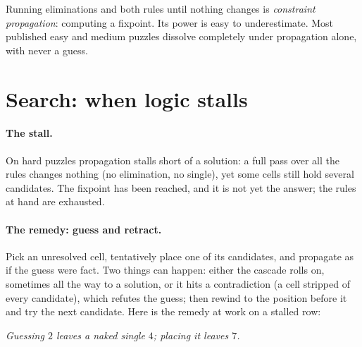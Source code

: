 \documentclass[11pt]{article}
\begin{document}
Running eliminations and both rules until nothing changes is
\emph{constraint propagation}: computing a fixpoint. Its power is easy
to underestimate. Most published easy and medium puzzles dissolve
completely under propagation alone, with never a guess.

\section{Search: when logic stalls}

\paragraph{The stall.}
On hard puzzles propagation stalls short of a solution: a full pass over
all the rules changes nothing (no elimination, no single), yet some
cells still hold several candidates. The fixpoint has been reached, and it
is not yet the answer; the rules at hand are exhausted.

\paragraph{The remedy: guess and retract.}
Pick an unresolved cell, tentatively place one of its candidates, and
propagate as if the guess were fact. Two things can happen: either the
cascade rolls on, sometimes all the way to a solution, or it hits a
contradiction (a cell stripped of every candidate), which refutes the
guess; then rewind to the position before it and try the next candidate.
Here is the remedy at work on a stalled row:

\begin{center}

\smallskip
\emph{Guessing $2$ leaves a naked single $4$; placing it leaves $7$.}
\end{center}
\end{document}
